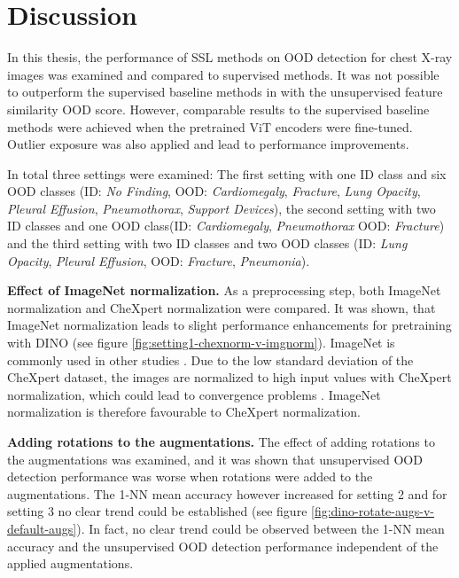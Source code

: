 \section{Discussion}
\label{section: discussion}
In this thesis, the performance of SSL methods on OOD detection for chest X-ray images was examined and compared to supervised methods.
It was not possible to outperform the supervised baseline methods in \citep{Berger2021} with the unsupervised feature similarity OOD score.
However, comparable results to the supervised baseline methods were achieved when the pretrained ViT encoders were fine-tuned.
Outlier exposure was also applied and lead to performance improvements.
\par
In total three settings were examined:
The first setting with one ID class and six OOD classes (ID: \textit{No Finding}, OOD: \textit{Cardiomegaly}, \textit{Fracture}, \textit{Lung Opacity}, \textit{Pleural Effusion}, \textit{Pneumothorax}, \textit{Support Devices}), the second setting with two ID classes and one OOD class(ID: \textit{Cardiomegaly}, \textit{Pneumothorax} OOD: \textit{Fracture}) and the third setting with two ID classes and two OOD classes (ID: \textit{Lung Opacity}, \textit{Pleural Effusion}, OOD: \textit{Fracture}, \textit{Pneumonia}).
\par
\textbf{Effect of ImageNet normalization.} As a preprocessing step, both ImageNet normalization and CheXpert normalization were compared.
It was shown, that ImageNet normalization leads to slight performance enhancements for pretraining with DINO (see figure \ref{fig:setting1-chexnorm-v-imgnorm}).
ImageNet is commonly used in other studies \citep{Azizi2021,Pham2020}.
Due to the low standard deviation of the CheXpert dataset, the images are normalized to high input values with CheXpert normalization, which could lead to convergence problems \citep{Lecun2002, He2015, Santurkar2019}.
ImageNet normalization is therefore favourable to CheXpert normalization.
\par
\textbf{Adding rotations to the augmentations.}
The effect of adding rotations to the augmentations was examined, and it was shown that unsupervised OOD detection performance was worse when rotations were added to the augmentations.
The 1-NN mean accuracy however increased for setting 2 and for setting 3 no clear trend could be established (see figure \ref{fig:dino-rotate-augs-v-default-augs}).
In fact, no clear trend could be observed between the 1-NN mean accuracy and the unsupervised OOD detection performance independent of the applied augmentations.
